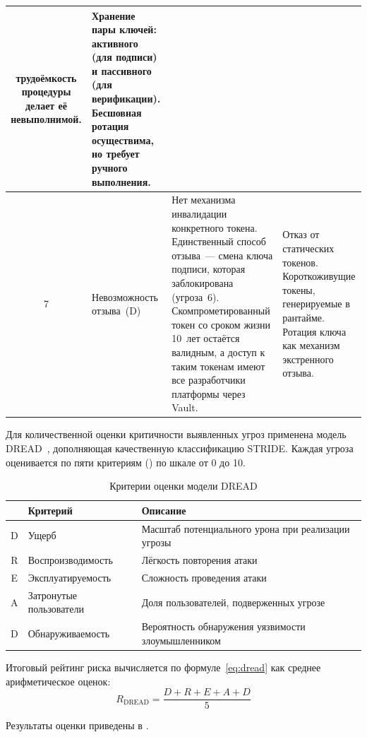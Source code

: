 \begin{longtable}{|c|p{3.2cm}|p{5.8cm}|p{5.8cm}|}
    трудоёмкость процедуры делает её невыполнимой. &
    Хранение пары ключей: активного (для подписи) и пассивного (для верификации).
    Бесшовная ротация осуществима, но требует ручного выполнения. \\
  \hline
  7 & Невозможность отзыва~(D) &
    Нет механизма инвалидации конкретного токена.
    Единственный способ отзыва~--- смена ключа подписи,
    которая заблокирована (угроза~6).
    Скомпрометированный токен со сроком жизни 10~лет остаётся валидным,
    а доступ к таким токенам имеют все разработчики платформы через Vault. &
    Отказ от статических токенов.
    Короткоживущие токены, генерируемые в рантайме.
    Ротация ключа как механизм экстренного отзыва. \\
\end{longtable}

Для количественной оценки критичности выявленных угроз применена модель
DREAD~\cite{DREAD}, дополняющая качественную классификацию STRIDE.
Каждая угроза оценивается по пяти критериям ()
по шкале от 0 до 10.

\begin{table}[h]
  \centering
  \caption{Критерии оценки модели DREAD}
  \label{tab:dread-criteria}
  \begin{tabularx}{\textwidth}{c l X}
    \hline
    & \textbf{Критерий} & \textbf{Описание} \\
    \hline
    D & Ущерб & Масштаб потенциального урона при реализации угрозы \\
    R & Воспроизводимость & Лёгкость повторения атаки \\
    E & Эксплуатируемость & Сложность проведения атаки \\
    A & Затронутые пользователи & Доля пользователей, подверженных угрозе \\
    D & Обнаруживаемость & Вероятность обнаружения уязвимости злоумышленником \\
    \hline
  \end{tabularx}
\end{table}

Итоговый рейтинг риска вычисляется по формуле~\eqref{eq:dread}
как среднее арифметическое оценок:
\begin{equation}\label{eq:dread}
  R_{\text{DREAD}} = \frac{D + R + E + A + D}{5}
\end{equation}

Результаты оценки приведены в .

